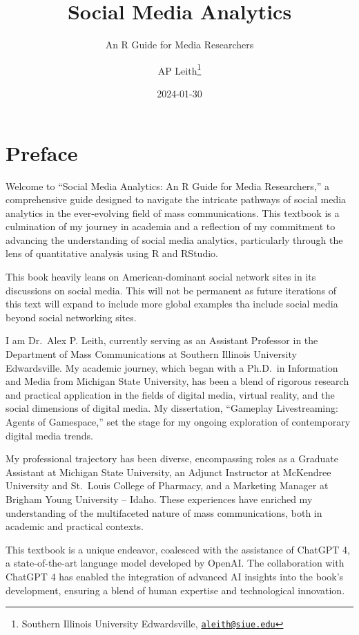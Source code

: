 \documentclass[
]{book}
\title{Social Media Analytics}
\subtitle{An R Guide for Media Researchers}
\author{AP Leith\footnote{Southern Illinois University Edwardsville, \href{mailto:aleith@siue.edu}{\nolinkurl{aleith@siue.edu}}}}
\date{2024-01-30}
\begin{document}
\maketitle

{
\setcounter{tocdepth}{1}
\tableofcontents
}
\hypertarget{preface}{%
\chapter*{Preface}\label{preface}}

Welcome to ``Social Media Analytics: An R Guide for Media Researchers,'' a comprehensive guide designed to navigate the intricate pathways of social media analytics in the ever-evolving field of mass communications. This textbook is a culmination of my journey in academia and a reflection of my commitment to advancing the understanding of social media analytics, particularly through the lens of quantitative analysis using R and RStudio.

This book heavily leans on American-dominant social network sites in its discussions on social media. This will not be permanent as future iterations of this text will expand to include more global examples tha include social media beyond social networking sites.

I am Dr.~Alex P. Leith, currently serving as an Assistant Professor in the Department of Mass Communications at Southern Illinois University Edwardsville. My academic journey, which began with a Ph.D.~in Information and Media from Michigan State University, has been a blend of rigorous research and practical application in the fields of digital media, virtual reality, and the social dimensions of digital media. My dissertation, ``Gameplay Livestreaming: Agents of Gamespace,'' set the stage for my ongoing exploration of contemporary digital media trends.

My professional trajectory has been diverse, encompassing roles as a Graduate Assistant at Michigan State University, an Adjunct Instructor at McKendree University and St.~Louis College of Pharmacy, and a Marketing Manager at Brigham Young University -- Idaho. These experiences have enriched my understanding of the multifaceted nature of mass communications, both in academic and practical contexts.

This textbook is a unique endeavor, coalesced with the assistance of ChatGPT 4, a state-of-the-art language model developed by OpenAI. The collaboration with ChatGPT 4 has enabled the integration of advanced AI insights into the book's development, ensuring a blend of human expertise and technological innovation.
\end{document}
